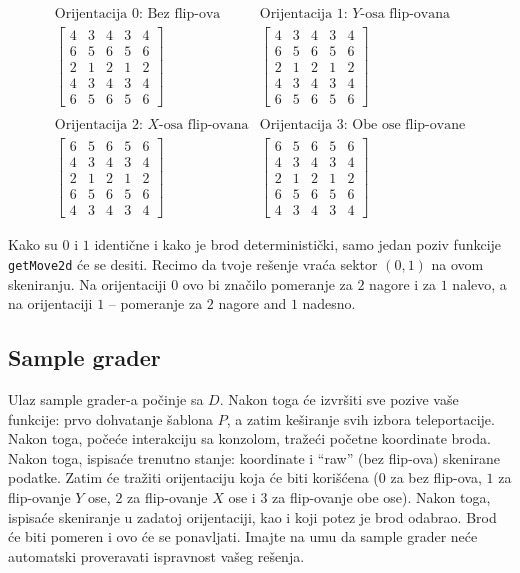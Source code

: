 \documentclass[12pt]{article}
\begin{document}
\[
\begin{array}{cc}
\text{Orijentacija $0$: Bez flip-ova} & \text{Orijentacija $1$: $Y$-osa flip-ovana} \\
\left[
\begin{array}{ccccc}
4 & 3 & 4 & 3 & 4 \\
6 & 5 & 6 & 5 & 6 \\
2 & 1 & 2 & 1 & 2 \\
4 & 3 & 4 & 3 & 4 \\
6 & 5 & 6 & 5 & 6
\end{array}
\right]
&
\left[
\begin{array}{ccccc}
4 & 3 & 4 & 3 & 4 \\
6 & 5 & 6 & 5 & 6 \\
2 & 1 & 2 & 1 & 2 \\
4 & 3 & 4 & 3 & 4 \\
6 & 5 & 6 & 5 & 6
\end{array}
\right]
\\
\\
\text{Orijentacija $2$: $X$-osa flip-ovana} & \text{Orijentacija $3$: Obe ose flip-ovane} \\
\left[
\begin{array}{ccccc}
6 & 5 & 6 & 5 & 6 \\
4 & 3 & 4 & 3 & 4 \\
2 & 1 & 2 & 1 & 2 \\
6 & 5 & 6 & 5 & 6 \\
4 & 3 & 4 & 3 & 4
\end{array}
\right]
&
\left[
\begin{array}{ccccc}
6 & 5 & 6 & 5 & 6 \\
4 & 3 & 4 & 3 & 4 \\
2 & 1 & 2 & 1 & 2 \\
6 & 5 & 6 & 5 & 6 \\
4 & 3 & 4 & 3 & 4
\end{array}
\right]
\end{array}
\] 

Kako su $0$ i $1$ identične i kako je brod deterministički, samo jedan poziv funkcije \verb|getMove2d| će se desiti. Recimo da tvoje rešenje vraća sektor $(0, 1)$ na ovom skeniranju. Na orijentaciji $0$ ovo bi značilo pomeranje za $2$ nagore i za $1$ nalevo, a na orijentaciji $1$ -- pomeranje za $2$ nagore and $1$ nadesno.

\subsection{Sample grader}

Ulaz sample grader-a počinje sa $D$. Nakon toga će izvršiti sve pozive vaše funkcije: prvo dohvatanje šablona $P$, a zatim keširanje svih izbora teleportacije. Nakon toga, počeće interakciju sa konzolom, tražeći početne koordinate broda. Nakon toga, ispisaće trenutno stanje: koordinate i ``raw'' (bez flip-ova) skenirane podatke. Zatim će tražiti orijentaciju koja će biti korišćena ($0$ za bez flip-ova, $1$ za flip-ovanje $Y$ ose, $2$ za flip-ovanje $X$ ose i $3$ za flip-ovanje obe ose). Nakon toga, ispisaće skeniranje u zadatoj orijentaciji, kao i koji potez je brod odabrao. Brod će biti pomeren i ovo će se ponavljati. Imajte na umu da sample grader neće automatski proveravati ispravnost vašeg rešenja.
\end{document}
